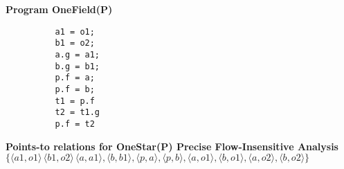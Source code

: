 \documentclass[12pt]{article}
\begin{document}
\begin{enumerate}
\begin{mdframed}
        \textbf{Program OneField(P)}
        \begin{lstlisting}
          a1 = o1;
          b1 = o2;
          a.g = a1;
          b.g = b1;
          p.f = a;
          p.f = b;
          t1 = p.f
          t2 = t1.g
          p.f = t2
        \end{lstlisting}

                \textbf{Points-to relations for OneStar(P) Precise Flow-Insensitive Analysis}
        $\{\langle a1, o1 \rangle\, \langle b1, o2 \rangle\, \langle a, a1 \rangle, \langle b, b1 \rangle, \langle p, a \rangle, \langle p, b \rangle, \langle a, o1 \rangle, \langle b, o1 \rangle, \langle a, o2 \rangle, \langle b, o2 \rangle \}$

    
  \end{mdframed}

\end{enumerate}
    
\end{document}
